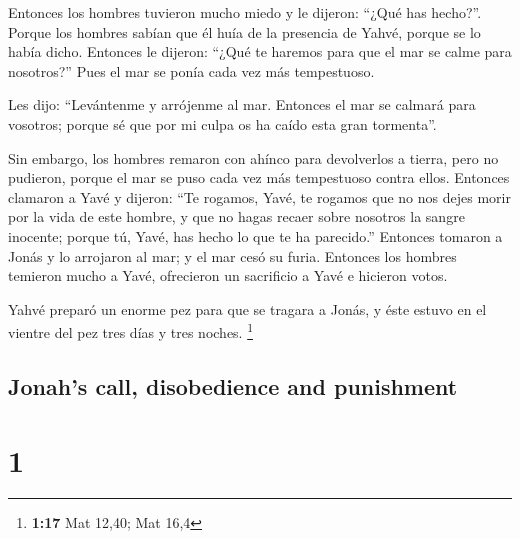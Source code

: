 \begin{paracol}{2}
 Entonces los hombres tuvieron mucho miedo y le dijeron:
``¿Qué has hecho?''. Porque los hombres sabían que él huía de la
presencia de Yahvé, porque se lo había dicho.  Entonces
le dijeron: ``¿Qué te haremos para que el mar se calme para nosotros?''
Pues el mar se ponía cada vez más tempestuoso.

 Les dijo: ``Levántenme y arrójenme al mar. Entonces el
mar se calmará para vosotros; porque sé que por mi culpa os ha caído
esta gran tormenta''.

 Sin embargo, los hombres remaron con ahínco para
devolverlos a tierra, pero no pudieron, porque el mar se puso cada vez
más tempestuoso contra ellos.  Entonces clamaron a Yavé y
dijeron: ``Te rogamos, Yavé, te rogamos que no nos dejes morir por la
vida de este hombre, y que no hagas recaer sobre nosotros la sangre
inocente; porque tú, Yavé, has hecho lo que te ha parecido.''
 Entonces tomaron a Jonás y lo arrojaron al mar; y el mar
cesó su furia.  Entonces los hombres temieron mucho a
Yavé, ofrecieron un sacrificio a Yavé e hicieron votos.

 Yahvé preparó un enorme pez para que se tragara a Jonás,
y éste estuvo en el vientre del pez tres días y tres noches. \footnote{\textbf{1:17}
  Mat 12,40; Mat 16,4}

\switchcolumn
\begin{otherlanguage}{english}

\hypertarget{jonahs-call-disobedience-and-punishment}{%
\subsection{Jonah's call, disobedience and
punishment}\label{jonahs-call-disobedience-and-punishment}}

\hypertarget{section-1}{%
\section{1}\label{section-1}}


\end{otherlanguage}
\end{paracol}

